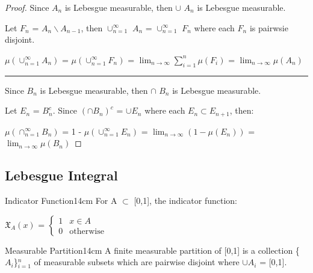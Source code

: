     \begin{proof}
        Since $A_n$ is Lebesgue measurable, then $\cup$ $A_n$ is
        Lebesgue measurable.

        Let $F_n$ = $A_n \backslash A_{n-1}$, then
        $\cup_{n=1}^{\infty}$ $A_n$ = $\cup_{n=1}^{\infty}$ $F_n$
        where each $F_n$ is pairwsie disjoint.

        \hspace{0.5cm}
        $\mu(\cup_{n=1}^{\infty} A_n)$
        = $\mu(\cup_{n=1}^{\infty} F_n)$
        = $\lim_{n \rightarrow \infty} \sum_{i=1}^n \mu(F_i)$
        = $\lim_{n \rightarrow \infty} \mu(A_n)$

        \rule[0.1cm]{15.2cm}{0.01cm}

        Since $B_n$ is Lebesgue measurable, then $\cap$ $B_n$ is
        Lebesgue measurable.

        Let $E_n$ = $B_n^c$. Since $(\cap B_n)^c$ = $\cup E_n$
        where each $E_n \subset E_{n+1}$, then:

        \hspace{0.5cm}
        $\mu(\cap_{n=1}^{\infty} B_n)$
        = 1 - $\mu(\cup_{n=1}^{\infty} E_n)$
        = $\lim_{n \rightarrow \infty} (1 - \mu(E_n))$
        = $\lim_{n \rightarrow \infty} \mu(B_n)$
    \end{proof}

    \newpage





\subsection{ Lebesgue Integral }

    \begin{definition}{Indicator Function}{14cm}
        For A $\subset$ [0,1], the indicator function:

        \hspace{0.5cm}
        $\mathfrak{X}_A(x)$ =
        $\begin{cases}
            1 & x \in A \\
            0 & \text{otherwise}
        \end{cases}$
    \end{definition}

    \vspace{0.5cm}



    \begin{definition}{Measurable Partition}{14cm}
        A finite {\color{lblue} measurable partition} of [0,1] is a
        collection \{$A_i$\}$_{i=1}^n$ of measurable subsets
        which are pairwise disjoint where $\cup A_i$ = [0,1].
    \end{definition}

